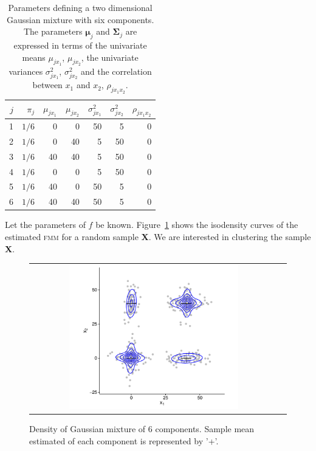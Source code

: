 \documentclass[submit]{smj}
\theoremstyle{definition}
\newcommand{\m}[1]{\boldsymbol{#1}}
\newcommand{\fmm}{\textsc{fmm}\xspace}
\begin{document}
\begin{table}[htpb]
\centering
\begin{tabular}{rrrrrrr}
  \hline
$j$ & $\pi_j$ & $\mu_{j x_1}$ & $\mu_{j x_2}$ & $\sigma^2_{j x_1}$ & $\sigma^2_{j x_2}$ & $\rho_{j x_1 x_2}$ \\ 
  \hline
  1 &  $1/6$ &     0 &     0 &    50 &     5 &     0 \\ 
  2 &  $1/6$  &     0 &    40 &     5 &    50 &     0 \\ 
  3 &  $1/6$  &    40 &    40 &     5 &    50 &     0 \\ 
  4 &  $1/6$  &     0 &     0 &     5 &    50 &     0 \\ 
  5 &  $1/6$  &    40 &     0 &    50 &     5 &     0 \\ 
  6 &  $1/6$  &    40 &    40 &    50 &     5 &     0 \\ 
   \hline
\end{tabular}
\caption{Parameters defining a two dimensional Gaussian mixture with six components. The parameters $\m\mu_j$ and $\m\Sigma_j$ are expressed in terms of the univariate means $\mu_{j x_1}$, $\mu_{j x_2}$, the univariate variances $\sigma^2_{j x_1}$, $\sigma^2_{j x_2}$ and the correlation between $x_1$ and $x_2$, $\rho_{j x_1 x_2}$.}
\label{pars_table}
\end{table}


Let the parameters of $f$ be known. Figure~\ref{ex_mixture} shows the isodensity curves of the estimated \fmm for 
a random sample \textbf{X}. We are interested in clustering the sample \textbf{X}.

\begin{figure}[htbp]
\begin{center}
\begin{tabular}{cc}
  \includegraphics[width=0.7\textwidth]{figures/partition-example-mixture.pdf} \\
 \end{tabular}
 \caption{Density of Gaussian mixture of 6 components. Sample mean estimated of each component is represented by '+'.}\label{ex_mixture}
\end{center}
\end{figure}
\end{document}
